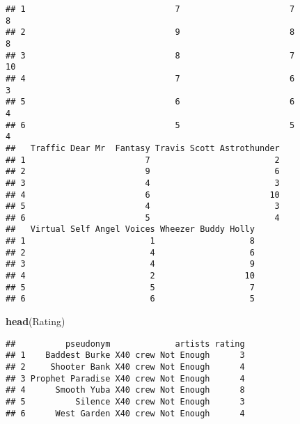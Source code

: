 \documentclass[]{article}
\newenvironment{Shaded}{\begin{snugshade}}{\end{snugshade}}
\newcommand{\KeywordTok}[1]{\textcolor[rgb]{0.13,0.29,0.53}{\textbf{#1}}}
\newcommand{\NormalTok}[1]{#1}
\begin{document}
\begin{verbatim}
## 1                              7                      7                  8
## 2                              9                      8                  8
## 3                              8                      7                 10
## 4                              7                      6                  3
## 5                              6                      6                  4
## 6                              5                      5                  4
##   Traffic Dear Mr  Fantasy Travis Scott Astrothunder
## 1                        7                         2
## 2                        9                         6
## 3                        4                         3
## 4                        6                        10
## 5                        4                         3
## 6                        5                         4
##   Virtual Self Angel Voices Wheezer Buddy Holly
## 1                         1                   8
## 2                         4                   6
## 3                         4                   9
## 4                         2                  10
## 5                         5                   7
## 6                         6                   5
\end{verbatim}

\begin{Shaded}
\begin{Highlighting}[]
\KeywordTok{head}\NormalTok{(Rating)}
\end{Highlighting}
\end{Shaded}

\begin{verbatim}
##          pseudonym             artists rating
## 1    Baddest Burke X40 crew Not Enough      3
## 2     Shooter Bank X40 crew Not Enough      4
## 3 Prophet Paradise X40 crew Not Enough      4
## 4      Smooth Yuba X40 crew Not Enough      8
## 5          Silence X40 crew Not Enough      3
## 6      West Garden X40 crew Not Enough      4
\end{verbatim}
\end{document}
